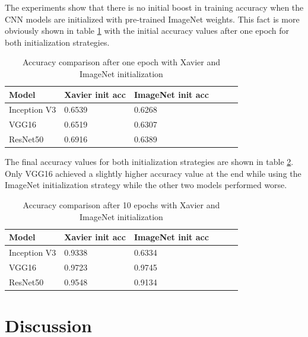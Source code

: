 \documentclass{article}
\theoremstyle{definition}
\theoremstyle{remark}
\begin{document}
The experiments show that there is no initial boost in training accuracy when the CNN models are initialized with pre-trained ImageNet weights. This fact is more obviously shown in table \ref{tab:one_epoch_xavier_vs_imagenet} with the initial accuracy values after one epoch for both initialization strategies.


\begin{table}[h!]
\center
\begin{tabular}{|l|l|l|l|l|l|}
\hline
\textbf{Model} & \textbf{Xavier init acc} & \textbf{ImageNet init acc}\\ \hline
 Inception V3	& 0.6539  & 0.6268\\ \hline
 VGG16  		& 0.6519  	 	 &  0.6307	  	\\ \hline     
 ResNet50  	& 0.6916  	  	 & 0.6389\\ \hline
\end{tabular}
\caption{Accuracy comparison after one epoch with Xavier and ImageNet initialization}
\label{tab:one_epoch_xavier_vs_imagenet}
\end{table}


The final accuracy values for both initialization strategies are shown in table \ref{tab:10_epochs_xavier_vs_imagenet}. Only VGG16 achieved a slightly higher accuracy value at the end while using the ImageNet initialization strategy while the other two models performed worse.

\begin{table}[h!]
\center
\begin{tabular}{|l|l|l|l|l|l|}
\hline
\textbf{Model} & \textbf{Xavier init acc} & \textbf{ImageNet init acc}\\ \hline
 Inception V3	& 0.9338  & 0.6334\\ \hline
 VGG16  		& 0.9723  	 	 &  0.9745	  	\\ \hline     
 ResNet50  	&  0.9548 	  	 & 0.9134 \\ \hline
\end{tabular}
\caption{Accuracy comparison after 10 epochs with Xavier and ImageNet initialization}
\label{tab:10_epochs_xavier_vs_imagenet}
\end{table}



\newpage




\section{Discussion} \label{discussion}
\end{document}
